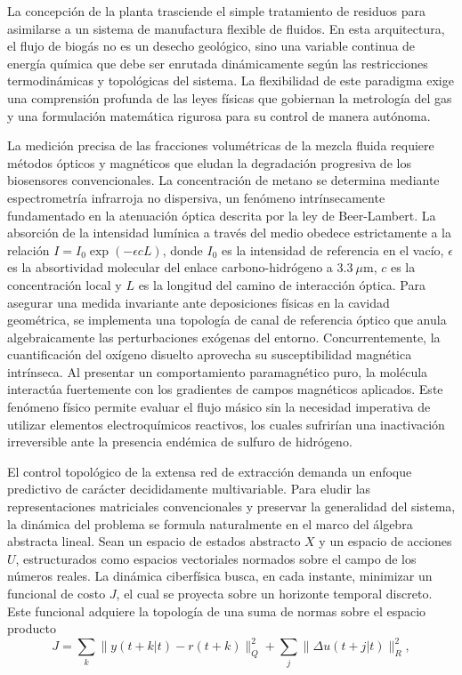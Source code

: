 \documentclass[11pt,letterpaper]{article}
\begin{document}
La concepción de la planta trasciende el simple tratamiento de residuos para
asimilarse a un sistema de manufactura flexible de fluidos. En esta
arquitectura, el flujo de biogás no es un desecho geológico, sino una variable
continua de energía química que debe ser enrutada dinámicamente según las
restricciones termodinámicas y topológicas del sistema. La flexibilidad de
este paradigma exige una comprensión profunda de las leyes físicas que
gobiernan la metrología del gas y una formulación matemática rigurosa para
su control de manera autónoma.

La medición precisa de las fracciones volumétricas de la mezcla fluida
requiere métodos ópticos y magnéticos que eludan la degradación progresiva de
los biosensores convencionales. La concentración de metano se determina
mediante espectrometría infrarroja no dispersiva, un fenómeno intrínsecamente
fundamentado en la atenuación óptica descrita por la ley de Beer-Lambert. La
absorción de la intensidad lumínica a través del medio obedece estrictamente
a la relación $I = I_{0} \exp(-\epsilon c L)$, donde $I_{0}$ es la intensidad
de referencia en el vacío, $\epsilon$ es la absortividad molecular del
enlace carbono-hidrógeno a $3.3~\mu\text{m}$, $c$ es la concentración local
y $L$ es la longitud del camino de interacción óptica. Para asegurar una
medida invariante ante deposiciones físicas en la cavidad geométrica, se
implementa una topología de canal de referencia óptico que anula
algebraicamente las perturbaciones exógenas del entorno. Concurrentemente,
la cuantificación del oxígeno disuelto aprovecha su susceptibilidad magnética
intrínseca. Al presentar un comportamiento paramagnético puro, la molécula
interactúa fuertemente con los gradientes de campos magnéticos aplicados.
Este fenómeno físico permite evaluar el flujo másico sin la necesidad
imperativa de utilizar elementos electroquímicos reactivos, los cuales
sufrirían una inactivación irreversible ante la presencia endémica de sulfuro
de hidrógeno.

El control topológico de la extensa red de extracción demanda un enfoque
predictivo de carácter decididamente multivariable. Para eludir las
representaciones matriciales convencionales y preservar la generalidad del
sistema, la dinámica del problema se formula naturalmente en el marco del
álgebra abstracta lineal. Sean un espacio de estados abstracto $X$ y un
espacio de acciones $U$, estructurados como espacios vectoriales normados
sobre el campo de los números reales. La dinámica ciberfísica busca, en cada
instante, minimizar un funcional de costo $J$, el cual se proyecta sobre un
horizonte temporal discreto. Este funcional adquiere la topología de una
suma de normas sobre el espacio producto
\begin{equation}
 J = \sum_{k} \|y(t+k|t) - r(t+k)\|_{Q}^{2} + \sum_{j} \|\Delta
 u(t+j|t)\|_{R}^{2},
\end{equation}
\end{document}
